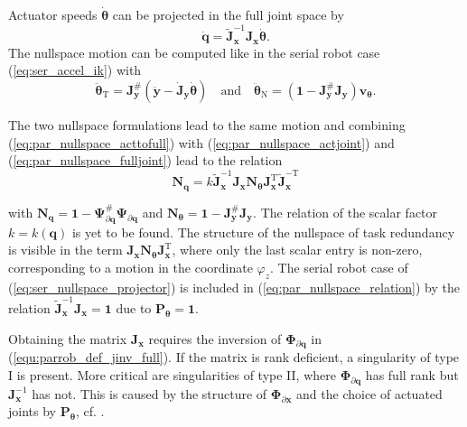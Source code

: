 \documentclass[a4paper,twoside]{article}
\newcommand{\transp}[0]{{\mathrm{T}}}
\begin{document}

Actuator speeds $\dot{\bm{\theta}}$ can be projected in the full joint space by
\begin{equation}
\dot{\bm{q}}=\tilde{\bm{J}}^{-1}_{\bm{x}}\bm{J}_{\bm{x}} \dot{\bm{\theta}}.
\label{eq:par_nullspace_acttofull}
\end{equation}
%
The nullspace motion can be computed like in the serial robot case (\ref{eq:ser_accel_ik}) with
\begin{equation}
\ddot{\bm{\theta}}_\mathrm{T} = \bm{J}_{\bm{y}}^{\#}(\ddot{\bm{y}} - \dot{\bm{J}}_{\bm{y}} \dot{\bm{\theta}})
\quad \mathrm{and} \quad
\ddot{\bm{\theta}}_\mathrm{N} = (\bm{1}-\bm{J}_{\bm{y}}^{\#}\bm{J}_{\bm{y}}) \bm{v}_{\bm{\theta}}.
\label{eq:par_nullspace_actjoint}
\end{equation}

The two nullspace formulations lead to the same motion and combining (\ref{eq:par_nullspace_acttofull}) with (\ref{eq:par_nullspace_actjoint})  and (\ref{eq:par_nullspace_fulljoint}) lead to the relation 
%
\begin{equation}
\bm{N}_{\bm{q}} = k \tilde{\bm{J}}^{-1}_{\bm{x}} \bm{J}_{\bm{x}} \bm{N}_{\bm{\theta}} \bm{J}_{\bm{x}}^\transp \tilde{\bm{J}}^{-\transp }_{\bm{x}}
\label{eq:par_nullspace_relation}
\end{equation}

with $\bm{N}_{\bm{q}}=\bm{1}-\bm{\Psi}_{\partial \bm{q}}^{\#}\bm{\Psi}_{\partial \bm{q}}$ and $\bm{N}_{\bm{\theta}}=\bm{1}-\bm{J}_{\bm{y}}^{\#}\bm{J}_{\bm{y}}$.
The relation of the scalar factor $k=k(\bm{q})$ is yet to be found.
The structure of the nullspace of task redundancy is visible in the term $ \bm{J}_{\bm{x}} \bm{N}_{\bm{\theta}} \bm{J}_{\bm{x}}^\transp$, where only the last scalar entry is non-zero, corresponding to a motion in the coordinate $\varphi_z$.
The serial robot case of (\ref{eq:ser_nullspace_projector}) is included in (\ref{eq:par_nullspace_relation}) by the relation $\tilde{\bm{J}}^{-1}_{\bm{x}} \bm{J}_{\bm{x}}=\bm{1}$ due to $\bm{P}_{\bm{\theta}}=\bm{1}$.



Obtaining the matrix $\bm{J}_{\bm{x}}$ requires the inversion of $\bm{\Phi}_{\partial \bm{q}}$ in (\ref{equ:parrob_def_jinv_full}).
If the matrix is rank deficient, a singularity of type I is present.
More critical are singularities of type II, where $\bm{\Phi}_{\partial \bm{q}}$ has full rank but $\bm{J}_{\bm{x}}^{-1}$ has not.
This is caused by the structure of $\bm{\Phi}_{\partial \bm{x}}$ and the choice of actuated joints by $\bm{P}_{\bm{\theta}}$, cf. \cite{Merlet2006a}.
\end{document}
